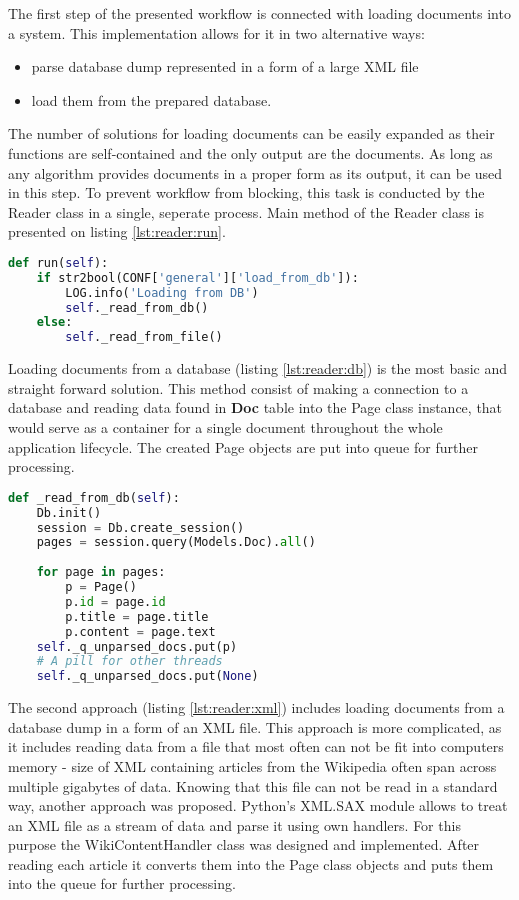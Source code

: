 The first step of the presented workflow is connected with loading documents into a system. This implementation allows for it in two alternative ways:
\begin{itemize}
\item parse database dump represented in a form of a large XML file 
\item load them from the prepared database.
\end{itemize}  The number of solutions for loading documents can be easily expanded as their functions are self-contained and the only output are the documents. As long as any algorithm provides documents in a proper form as its output, it can be used in this step. To prevent workflow from blocking, this task is conducted by the Reader class in a single, seperate process. Main method of the Reader class is presented on listing \ref{lst:reader:run}.


\begin{lstlisting}[language=Python, caption={Reader.run() - Reader class process main method}, label={lst:reader:run}]
def run(self):
    if str2bool(CONF['general']['load_from_db']):
        LOG.info('Loading from DB')
        self._read_from_db()
    else:
        self._read_from_file()
\end{lstlisting}

Loading documents from a database (listing \ref{lst:reader:db}) is the most basic and straight forward solution. This method consist of making a connection to a database and reading data found in \textbf{Doc} table into the Page class instance, that would serve as a container for a single document throughout the whole  application lifecycle. The created Page objects are put into queue for further processing.

\begin{lstlisting}[language=Python, caption={Reader.\_read\_from\_db() - reading docs from database}, label={lst:reader:db}]
def _read_from_db(self):
	Db.init()
	session = Db.create_session()
	pages = session.query(Models.Doc).all()
	
	for page in pages:
		p = Page()
		p.id = page.id
		p.title = page.title
		p.content = page.text
	self._q_unparsed_docs.put(p)
	# A pill for other threads
	self._q_unparsed_docs.put(None)
\end{lstlisting}

The second approach (listing \ref{lst:reader:xml}) includes loading documents from a database dump in a form of an XML file. This approach is more complicated, as it includes reading data from a file that most often can not be fit into computers memory - size of XML containing articles from the Wikipedia often span across multiple gigabytes of data. Knowing that this file can not be read in a standard way, another approach was proposed. Python's XML.SAX module allows to treat an XML file as a stream of data and parse it using own handlers. For this purpose the WikiContentHandler class was designed and implemented. After reading each article it converts them into the Page class objects and puts them into the queue for further processing.

